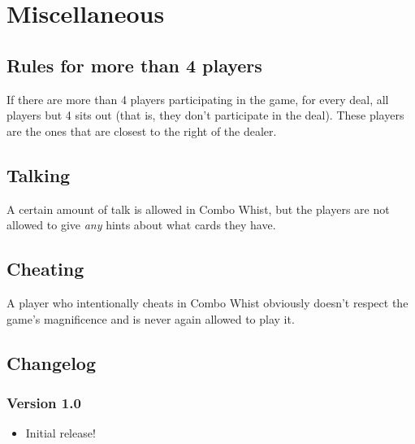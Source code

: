 \documentclass[a4paper]{article}
\begin{document}
	\section{Miscellaneous}
		\subsection{Rules for more than 4 players}
		If there are more than 4 players participating in the game, for every deal, all players but 4 sits out (that is, they don't participate in the deal). These players are the ones that are closest to the right of the dealer.
		
		
		
		\subsection{Talking}
		A certain amount of talk is allowed in Combo Whist, but the players are not allowed to give \emph{any} hints about what cards they have.
		
		\subsection{Cheating}
		A player who intentionally cheats in Combo Whist obviously doesn't respect the game's magnificence and is never again allowed to play it.
		
		\subsection{Changelog}
			\subsubsection{Version 1.0}
			\begin{itemize}
				\item Initial release!
			\end{itemize}
\end{document}
